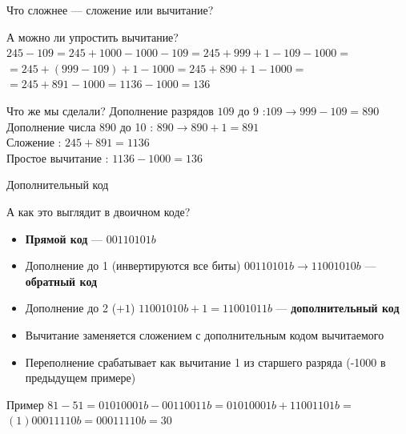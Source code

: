 \documentclass{beamer}
\begin{document}
    \begin{frame}{Что сложнее --- сложение или вычитание?}
        \begin{block}{А можно ли упростить вычитание?}
        \pause
        $245 - 109 = 245 + 1000 - 1000 - 109 = 245 + 999 + 1 - 109 - 1000 =$ \\
        $ = 245 + (999 - 109) + 1 - 1000 = 245 + 890 + 1 - 1000  = $ \\
        $ = 245 + 891 - 1000 = 1136 - 1000 = 136$
        \end{block}
        \pause
        \begin{block}{Что же мы сделали?}
            Дополнение разрядов $109$ до 9 :$109 \to 999 - 109 = 890$ \\
            Дополнение числа $890$ до 10 : $890 \to 890 + 1 = 891$ \\
            Сложение : $245 + 891 = 1136$ \\
            Простое вычитание : $1136 - 1000 = 136$
        \end{block}
    \end{frame}
    \begin{frame}{Дополнительный код}
        \begin{block}{А как это выглядит в двоичном коде?}
            \begin{itemize}
                \item {\bf Прямой код} --- $00110101b$
                \item Дополнение до 1 (инвертируются все биты) $00110101b \to 11001010b$ --- {\bf обратный код}
                \item Дополнение до 2 ($+1$) $11001010b + 1 = 11001011b$ --- {\bf дополнительный код}
                \item Вычитание заменяется сложением с дополнительным кодом вычитаемого
                \item Переполнение срабатывает как вычитание 1 из старшего разряда (-1000 в предыдущем примере)
            \end{itemize}
        \end{block}
        \pause
        \begin{block}{Пример}
        $81 - 51 = 01010001b - 00110011b = 01010001b + 11001101b = $ \\
        $(1)00011110b = 00011110b = 30$
        \end{block}
    \end{frame}
\end{document}
